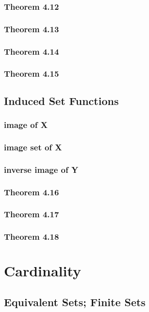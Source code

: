 \documentclass[a4paper]{article}
\begin{document}
\subsubsection*{Theorem 4.12}
\subsubsection*{Theorem 4.13}
\subsubsection*{Theorem 4.14}
\subsubsection*{Theorem 4.15}

\newpage
\subsection{Induced Set Functions}   %
\subsubsection*{image of X}
\subsubsection*{image set of X}
\subsubsection*{inverse image of Y}
\subsubsection*{Theorem 4.16}
\subsubsection*{Theorem 4.17}
\subsubsection*{Theorem 4.18}

\newpage
\section{Cardinality}   %
\subsection{Equivalent Sets; Finite Sets}   %
\end{document}
